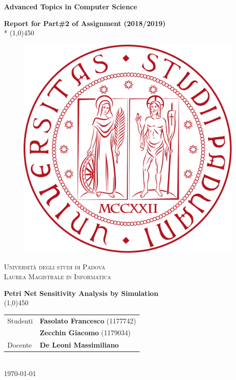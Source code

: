\documentclass[a4paper,12pt]{article}
\begin{document}

	\begin{titlepage}
		\centering
		\vspace{7cm}
		{\huge\bfseries Advanced Topics in Computer Science\par}
		\vspace*{0,5cm}
		{\Large\bfseries Report for Part\#2 of Assignment (2018/2019)} \\*
		\line(1,0){450} \\
		\vspace*{2cm}
		\begin{figure}[h!]
		    \centering
		    \includegraphics[scale=0.20]{figures/unipd_logo.png}
		    \label{fig:unipd_logo}
		\end{figure}
		{\scshape\Large Università degli studi di Padova\\ \large Laurea Magistrale in Informatica \par}
		\vspace{2cm}
		{\LARGE\bfseries Petri Net Sensitivity Analysis by Simulation}\\
		\line(1,0){450}\\
		\vspace{1cm}
		\begin{tabular}{l|l}
			 Studenti  & \textbf{Fasolato Francesco} (1177742)\\ & \textbf{Zecchin Giacomo} (1179034) \\
			 Docente    & \textbf{De Leoni Massimiliano} \\
		\end{tabular}\\
		\vspace*{3,5cm}
        \today
	\end{titlepage}
\end{document}
